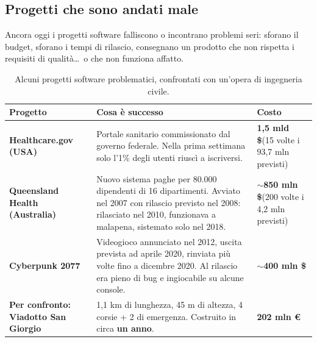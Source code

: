 
\subsection{Progetti che sono andati male}

Ancora oggi i progetti software falliscono o incontrano problemi seri: sforano il budget, sforano i tempi di rilascio,
consegnano un prodotto che non rispetta i requisiti di qualità\ldots\ o che non funziona affatto.

\begin{table}[H]
\centering
\renewcommand{\arraystretch}{1.4}
\begin{tabularx}{\textwidth}{>{\bfseries}P{3.4cm} L >{\centering\arraybackslash}p{3.2cm}}
\toprule
Progetto & Cosa è successo & Costo \\
\midrule
Healthcare.gov (USA) & Portale sanitario commissionato dal governo federale. Nella prima settimana solo l'1\% degli utenti riuscì a iscriversi. & \textbf{1,5 mld \$}\newline\scriptsize(15 volte i 93,7 mln previsti) \\
Queensland Health (Australia) & Nuovo sistema paghe per 80.000 dipendenti di 16 dipartimenti. Avviato nel 2007 con rilascio previsto nel 2008: rilasciato nel 2010, funzionava a malapena, sistemato solo nel 2018. & \textbf{$\sim$850 mln \$}\newline\scriptsize(200 volte i 4,2 mln previsti) \\
Cyberpunk 2077 & Videogioco annunciato nel 2012, uscita prevista ad aprile 2020, rinviata più volte fino a dicembre 2020. Al rilascio era pieno di bug e ingiocabile su alcune console. & \textbf{$\sim$400 mln \$} \\
\midrule
{} Per confronto: Viadotto San Giorgio & 1,1 km di lunghezza, 45 m di altezza, 4 corsie + 2 di emergenza. Costruito in circa \textbf{un anno}. & \textbf{202 mln €} \\
\bottomrule
\end{tabularx}
\caption{Alcuni progetti software problematici, confrontati con un'opera di ingegneria civile.}
\end{table}


